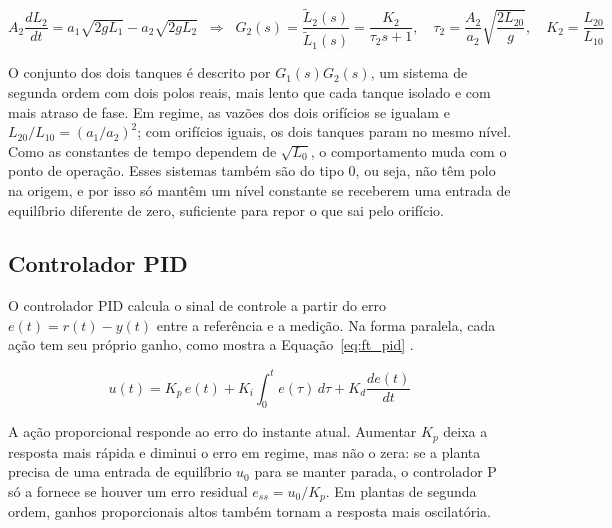 \documentclass[a4paper,12pt]{article}
\begin{document}
\begin{equation}
    A_2 \frac{dL_2}{dt} = a_1\sqrt{2gL_1} - a_2\sqrt{2gL_2}
    \;\;\Rightarrow\;\;
    G_2(s) = \frac{\tilde{L}_2(s)}{\tilde{L}_1(s)} = \frac{K_2}{\tau_2 s + 1}, \quad \tau_2 = \frac{A_2}{a_2}\sqrt{\frac{2L_{20}}{g}}, \quad K_2 = \frac{L_{20}}{L_{10}}
    \label{eq:ft_g2}
\end{equation}

\begin{justify}
    \hspace{4ex}O conjunto dos dois tanques é descrito por $G_1(s)G_2(s)$, um sistema de segunda ordem com dois polos reais, mais lento que cada tanque isolado e com mais atraso de fase. Em regime, as vazões dos dois orifícios se igualam e $L_{20}/L_{10} = (a_1/a_2)^2$; com orifícios iguais, os dois tanques param no mesmo nível. Como as constantes de tempo dependem de $\sqrt{L_0}$, o comportamento muda com o ponto de operação. Esses sistemas também são do tipo 0, ou seja, não têm polo na origem, e por isso só mantêm um nível constante se receberem uma entrada de equilíbrio diferente de zero, suficiente para repor o que sai pelo orifício.
\end{justify}

\subsection{Controlador PID}

\begin{justify}
    \hspace{4ex}O controlador PID calcula o sinal de controle a partir do erro $e(t) = r(t) - y(t)$ entre a referência e a medição. Na forma paralela, cada ação tem seu próprio ganho, como mostra a Equação~\eqref{eq:ft_pid} \cite{ogata2010, astrom2006}.
\end{justify}

\begin{equation}
    u(t) = K_p\, e(t) + K_i \int_0^t e(\tau)\, d\tau + K_d \frac{de(t)}{dt}
    \label{eq:ft_pid}
\end{equation}

\begin{justify}
    \hspace{4ex}A ação proporcional responde ao erro do instante atual. Aumentar $K_p$ deixa a resposta mais rápida e diminui o erro em regime, mas não o zera: se a planta precisa de uma entrada de equilíbrio $u_0$ para se manter parada, o controlador P só a fornece se houver um erro residual $e_{ss} = u_0/K_p$. Em plantas de segunda ordem, ganhos proporcionais altos também tornam a resposta mais oscilatória.
\end{justify}
\end{document}
